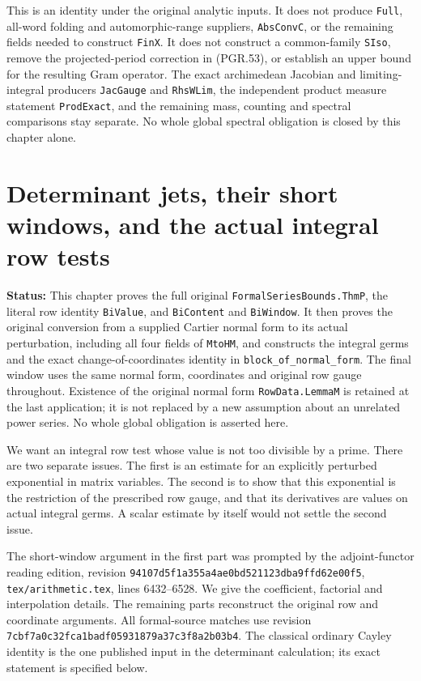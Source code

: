 \documentclass[11pt,a4paper]{article}
\numberwithin{equation}{section}
\theoremstyle{remark}\newtheorem{remark}[theorem]{Remark}
\newcommand{\status}[1]{\textbf{Status:} #1}
\begin{document}
This is an identity under the original analytic inputs.  It does not
produce \texttt{Full}, all-word folding and automorphic-range
suppliers, \texttt{Abs\allowbreak Conv\allowbreak C}, or the remaining fields needed to
construct \texttt{Fin\allowbreak X}.  It does not construct a common-family
\texttt{SIso}, remove the projected-period correction in (PGR.53),
or establish an upper bound for the resulting Gram operator.
The exact archimedean Jacobian and limiting-integral producers
\texttt{Jac\allowbreak Gauge} and \texttt{Rhs\allowbreak WLim}, the independent product
measure statement \texttt{Prod\allowbreak Exact}, and the remaining mass,
counting and spectral comparisons stay separate.  No whole global
spectral obligation is closed by this chapter alone.


\section{Determinant jets, their short windows, and the actual integral row tests}
\label{sec:determinant-jet-v057}

\status{This chapter proves the full original
\texttt{Formal\allowbreak Series\allowbreak Bounds.\allowbreak Thm\allowbreak P}, the literal row identity
\texttt{Bi\allowbreak Value}, and \texttt{Bi\allowbreak Content} and \texttt{Bi\allowbreak Window}.
It then proves the original conversion from a supplied Cartier normal
form to its actual perturbation, including all four fields of
\texttt{Mto\allowbreak HM}, and constructs the integral germs and the exact
change-of-coordinates identity in \texttt{block\_\allowbreak of\_\allowbreak normal\_\allowbreak form}.
The final window uses the same normal form, coordinates and original
row gauge throughout.  Existence of the original normal form
\texttt{Row\allowbreak Data.\allowbreak Lemma\allowbreak M} is retained at the last application; it is not
replaced by a new assumption about an unrelated power series.
No whole global obligation is asserted here.}

We want an integral row test whose value is not too divisible by a
prime.  There are two separate issues.  The first is an estimate for
an explicitly perturbed exponential in matrix variables.  The second
is to show that this exponential is the restriction of the prescribed
row gauge, and that its derivatives are values on actual integral
germs.  A scalar estimate by itself would not settle the second issue.

The short-window argument in the first part was prompted by the
adjoint-functor reading edition, revision
\texttt{94107d5f1a355a4ae0bd521123dba9ffd62e00f5},
\texttt{tex/\allowbreak arithmetic.\allowbreak tex}, lines 6432--6528.  We give the coefficient,
factorial and interpolation details.  The remaining parts reconstruct
the original row and coordinate arguments.  All formal-source matches
use revision
\texttt{7cbf7a0c32fca1badf05931879a37c3f8a2b03b4}.
The classical ordinary Cayley identity is the one published input in
the determinant calculation; its exact statement is specified below.
\end{document}
